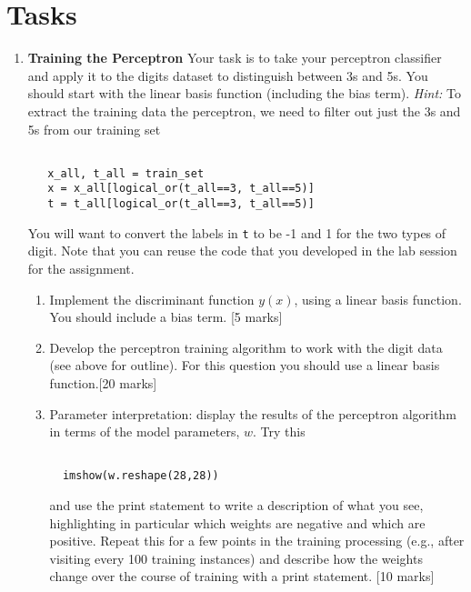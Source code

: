 \documentclass{article}
\begin{document}
\section{Tasks}
\begin{enumerate}
\item \textbf{Training the Perceptron} Your task is to take your perceptron classifier and apply it to the digits dataset to distinguish between 3s and 5s. You should start with the linear basis function (including the bias term). \emph{Hint:} To extract the training data the perceptron, we need to filter out just the 3s and 5s from our training set
\begin{verbatim}

   x_all, t_all = train_set
   x = x_all[logical_or(t_all==3, t_all==5)]
   t = t_all[logical_or(t_all==3, t_all==5)]
\end{verbatim}
You will want to convert the labels in \lstinline+t+ to be -1 and 1 for the two types of digit. Note that you can reuse the code that you developed in the lab session for the assignment.

\begin{enumerate}
\item Implement the discriminant function $y(x)$, using a linear basis function. You should include a bias term. \hfill [5 marks]
\item Develop the perceptron training algorithm to work with the digit data (see above for outline). For this question you should use a linear basis function.\hfill [20 marks]
\item Parameter interpretation: display the results of the perceptron algorithm in terms of the model parameters, $w$. Try this 
\begin{verbatim}

  imshow(w.reshape(28,28))
\end{verbatim}
and use the print statement to write a description of what you see, highlighting in particular which weights are negative and which are positive. 
Repeat this for a few points in the training processing (e.g., after visiting every 100 training instances) and describe how the weights change over
the course of training with a print statement. \hfill [10 marks]
\end{enumerate}


\end{enumerate}
\end{document}

